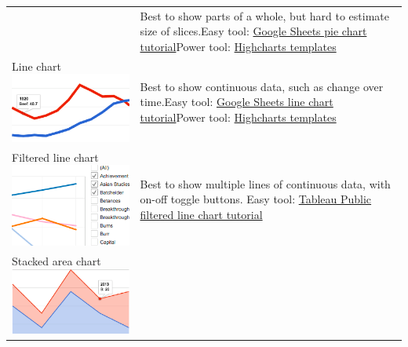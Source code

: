 \documentclass[
  english,
]{book}
\begin{document}
\begin{longtable}[]{@{}ll@{}}
\begin{minipage}[t]{0.47\columnwidth}
\end{minipage} & \begin{minipage}[t]{0.47\columnwidth}\raggedright
Best to show parts of a whole, but hard to estimate size of slices.Easy tool: \href{pie-line-area-google}{Google Sheets pie chart tutorial}Power tool: \href{highcharts}{Highcharts templates}\strut
\end{minipage}\tabularnewline
\begin{minipage}[t]{0.47\columnwidth}\raggedright
Line chart \includegraphics{images/05-chart/chart-line.png}\strut
\end{minipage} & \begin{minipage}[t]{0.47\columnwidth}\raggedright
Best to show continuous data, such as change over time.Easy tool: \href{pie-line-area-google}{Google Sheets line chart tutorial}Power tool: \href{highcharts}{Highcharts templates}\strut
\end{minipage}\tabularnewline
\begin{minipage}[t]{0.47\columnwidth}\raggedright
Filtered line chart \includegraphics{images/05-chart/chart-filtered-line.png}\strut
\end{minipage} & \begin{minipage}[t]{0.47\columnwidth}\raggedright
Best to show multiple lines of continuous data, with on-off toggle buttons. Easy tool: \href{filtered-line-chart-tableau}{Tableau Public filtered line chart tutorial}\strut
\end{minipage}\tabularnewline
\begin{minipage}[t]{0.47\columnwidth}\raggedright
Stacked area chart \includegraphics{images/05-chart/chart-stacked-area.png}\strut

\end{minipage}
\end{longtable}
\end{document}
